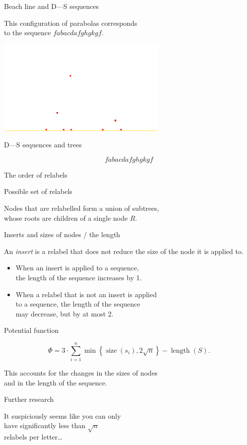 \documentclass[17pt]{extarticle}
\newcommand{\newslide}[1]{\newpage \begin{center} \large #1 \end{center}}
\DeclareMathOperator{\size}{size}
\DeclareMathOperator{\length}{length}
\begin{document}
\newslide{Beach line and D—S sequences} \vspace{-7mm}

This configuration of parabolas corresponds \\
to the sequence \( fabacdafghgkgf \).

\begin{center}
	\includegraphics[height=4.6cm]{figs/parab-config-dark}
\end{center}

\newslide{D—S sequences and trees} \vspace{-7mm}
\[ fabacdafghgkgf \] \vspace{-16mm}



\newslide{The order of relabels}



\newslide{Possible set of relabels} \vspace{-15mm}

 \vspace{-2mm}

Nodes that are relabelled form a union of subtrees, \\
whose roots are children of a single node \(R\).

\newslide{Inserts and sizes of nodes / the length} \vspace{-6mm}

	An {\it insert} is a relabel that does not reduce the size of the node it is applied to. \vspace{-3mm}

\begin{itemize}
	\item When an insert is applied to a sequence, \\
	   the length of the sequence increases by 1.
	\item When a relabel that is not an insert is applied \\
	   to a sequence, the length of the sequence \\
	   may decrease, but by at most 2.
\end{itemize}

\newslide{Potential function}
   \[
	Φ = 3 \cdot \sum\limits_{i=1}^n
	\min\left\{ \size(s_i), 2 \sqrt{n} \right\}
	- \length (S).
   \]

This accounts for the changes in the sizes of nodes \\
and in the length of the sequence.

\newslide{Further research}

It suspiciously seems like you can only \\
have significantly less than $\sqrt{n}$ \\
relabels per letter…
\end{document}
